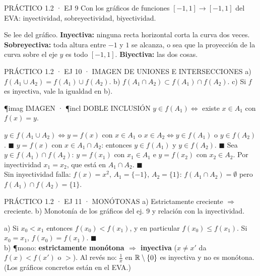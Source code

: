 \begin{enunciado}{PRÁCTICO 1.2 · EJ 9}
Con los gráficos de funciones $[-1,1]\to[-1,1]$ del EVA: inyectividad, sobreyectividad, biyectividad.
\end{enunciado}
\begin{falta}
Se lee del gráfico. \textbf{Inyectiva:} ninguna recta horizontal corta la curva dos veces. \textbf{Sobreyectiva:} toda altura entre $-1$ y $1$ se alcanza, o sea que la proyección de la curva sobre el eje $y$ es todo $[-1,1]$. \textbf{Biyectiva:} las dos cosas.
\end{falta}

\begin{enunciado}{PRÁCTICO 1.2 · EJ 10 · IMAGEN DE UNIONES E INTERSECCIONES}
a) $f(A_1\cup A_2)=f(A_1)\cup f(A_2)$. b) $f(A_1\cap A_2)\subset f(A_1)\cap f(A_2)$. c) Si $f$ es inyectiva, vale la igualdad en b).
\end{enunciado}
\begin{uso}{\P{imag} IMAGEN · \P{incl} DOBLE INCLUSIÓN}
$y\in f(A_1)\iff$ existe $x\in A_1$ con $f(x)=y$.
\end{uso}
$y\in f(A_1\cup A_2)\iff y=f(x)$ con $x\in A_1$ o $x\in A_2\iff y\in f(A_1)$ o $y\in f(A_2)$. $\blacksquare$
$y=f(x)$ con $x\in A_1\cap A_2$: entonces $y\in f(A_1)$ y $y\in f(A_2)$. $\blacksquare$
Sea $y\in f(A_1)\cap f(A_2)$: $y=f(x_1)$ con $x_1\in A_1$ e $y=f(x_2)$ con $x_2\in A_2$. Por inyectividad $x_1=x_2$, que está en $A_1\cap A_2$. $\blacksquare$\\
Sin inyectividad falla: $f(x)=x^2$, $A_1=\{-1\}$, $A_2=\{1\}$: $f(A_1\cap A_2)=\emptyset$ pero $f(A_1)\cap f(A_2)=\{1\}$.

\begin{enunciado}{PRÁCTICO 1.2 · EJ 11 · MONÓTONAS}
a) Estrictamente creciente $\Rightarrow$ creciente. b) Monotonía de los gráficos del ej. 9 y relación con la inyectividad.
\end{enunciado}
a) Si $x_0<x_1$ entonces $f(x_0)<f(x_1)$, y en particular $f(x_0)\le f(x_1)$. Si $x_0=x_1$, $f(x_0)=f(x_1)$. $\blacksquare$\\
b) \P{mono}: \textbf{estrictamente monótona $\Rightarrow$ inyectiva} ($x\neq x'$ da $f(x)<f(x')$ o $>$). Al revés no: $\frac1x$ en $\mathbb{R}\setminus\{0\}$ es inyectiva y no es monótona. (Los gráficos concretos están en el EVA.)


